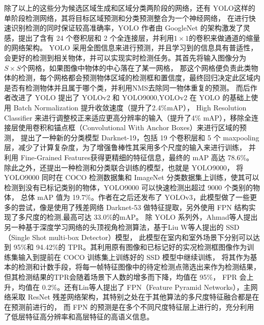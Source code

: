 除了以上的这些分为候选区域生成和区域分类两阶段的网络，还有 YOLO\cite{37}这样的单阶段检测网络，其将目标区域预测和分类预测整合为一个神经网络，
在进行快速识别检测的同时保证较高准确率，YOLO 作者由 GoogleNet 的架构\cite{38}激发了灵感，提出了含有 24 个卷积层和 2 个全连接层，并利用$1\times 1$的卷积来做通道的缩量的网络架构。
YOLO 采用全图信息来进行预测，并且学习到的信息具有普适性，会更好的检测到相关物体，并可以实现实时检测任务。其首先将输入图像分为$S\times S$个网格，如果图像中物体的中心落在了某一网格，
那这个网格便负责此类物体的检测，每个网格都会预测物体区域的检测框和置信度，最终回归决定此区域内是否有检测物体并且属于哪个类，并利用NMS去除同一物体重复的预测。
而后作者改进了 YOLO 提出了 YOLOv2 和 YOLO9000\cite{39},YOLOv2 在 YOLO 的基础上使用 Batch Normalization 提升收敛速度（提升了2.4\%mAP），
High Resolution Classifier 来进行调整校正来适应更高分辨率的输入（提升了4\% mAP），移除全连接层使用卷积和锚点框（Convolutional With Anchor Boxes）来进行区域的预测，
提出了一种新的分类模型 Darknet-19，包括 19 个卷积层和 5 个 maxpooling 层，减少了计算复杂度，为了增强鲁棒性其采用多个尺度的输入来进行训练，
并利用 Fine-Grained Features获得更精细的特征信息，最终的 mAP 高达 78.6\%。除此之外，还提出一种检测和分类联合训练的模型，也就是 YOLO9000，
将 YOLO9000 同时在 COCO 检测数据集和 ImageNet 分类数据集上训练，使其可以检测到没有已标记类别的物体，YOLO9000 可以快速检测出超过 9000 个类别的物体，
总体 mAP 值为 19.7\%。作者在之后还发布了 YOLOv3\cite{40}，此模型做了一些更多的尝试，像是使用了残差网络 Darknet-53 做特征提取，另外使用 FPN 结构实现了多尺度的检测,最高可达 33.0\%的mAP。
除 YOLO 系列外，Ahmad等人\cite{41}提出另一种基于深度学习网络的头顶视角检测算法，基于Liu W等人\cite{42}提出的 SSD（Single Shot multi-box Detector）模型，
此模型在室内和室外场景下分别可以达到 95\%和 94.42\%的 TPR。其利用原有图像和已标记好的实况检测框图像作为训练集输入到提前在 COCO 训练集上训练好的 SSD 模型中继续训练，
将其作为基本的检测和计数手段，将每一帧特征图像中的待定检测点筛选出来作为检测结果，但其检测结果的TPR会随着场景下人数的增多而下降，均值在 95\%，
FPR 会上升，均值在 0.2\%。还有Lin等人\cite{43}提出了 FPN（Feature Pyramid Networks），主网络采取 ResNet 残差网络架构，其特别之处在于其他算法的多尺度特征融合都是在在预测前进行的，
而 FPN 的预测是在多个不同尺度特征层上进行的，充分利用了低层特征高分辨率和高层特征的高语义信息。

